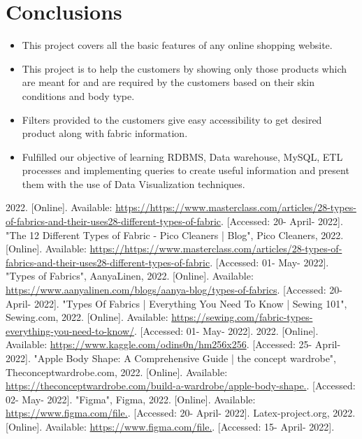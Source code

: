 \documentclass[11pt,journal,compsoc]{IEEEtran}
\begin{document}
\section{Conclusions}
\begin{itemize}
    \item[12.1] This project covers all the basic features of any online shopping website.  
    \item[12.2] This project is to help the customers by showing only those products which are meant for and are required by the customers based on their skin conditions and body type.
    \item[12.3] Filters provided to the customers give easy accessibility to get desired product along with fabric information.
    \item[12.4] Fulfilled our objective of learning RDBMS, Data warehouse, MySQL, ETL processes and implementing queries to create useful information and present them with the use of Data Visualization techniques.  
\end{itemize}
 \begin{thebibliography}{1}
 \bibitem{}
 2022. [Online]. Available: 
 \url{https://https://www.masterclass.com/articles/28-types-of-fabrics-and-their-uses28-different-types-of-fabric}. [Accessed: 20- April- 2022].
  \bibitem{}
 "The 12 Different Types of Fabric - Pico Cleaners | Blog", Pico Cleaners, 2022. [Online]. Available: \url{https://https://www.masterclass.com/articles/28-types-of-fabrics-and-their-uses28-different-types-of-fabric}. [Accessed: 01- May- 2022].
 \bibitem{}
 "Types of Fabrics", AanyaLinen, 2022. [Online]. Available: 
 \url{ https://www.aanyalinen.com/blogs/aanya-blog/types-of-fabrics}. [Accessed: 20- April- 2022].
 \bibitem{}
 "Types Of Fabrics | Everything You Need To Know | Sewing 101", Sewing.com, 2022. [Online]. Available: 
 \url{ https://sewing.com/fabric-types-everything-you-need-to-know/}. [Accessed: 01- May- 2022]. 
 \bibitem{}
 2022. [Online]. Available:
 \url{https://www.kaggle.com/odins0n/hm256x256}. [Accessed: 25- April- 2022].
 \bibitem{}
 "Apple Body Shape: A Comprehensive Guide | the concept wardrobe", Theconceptwardrobe.com, 2022. [Online]. Available:
 \url{https://theconceptwardrobe.com/build-a-wardrobe/apple-body-shape.}. [Accessed: 02- May- 2022].
 \bibitem{}
 "Figma", Figma, 2022. [Online]. Available:
 \url{https://www.figma.com/file.}. [Accessed: 20- April- 2022].
 \bibitem{}
 Latex-project.org, 2022. [Online]. Available:
 \url{https://www.figma.com/file.}. [Accessed: 15- April- 2022].
 \end{thebibliography}
\end{document}
